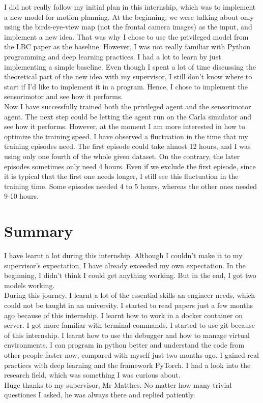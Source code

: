\documentclass[inputenc=utf8]{ldvarticle}
\begin{document}
\noindent I did not really follow my initial plan in this internship, which was to implement a new model for motion planning. At the beginning, we were talking about only using the birds-eye-view map (not the frontal camera images) as the input, and implement a new idea. That was why I chose to use the privileged model from the LBC paper as the baseline. However, I was not really familiar with Python programming and deep learning practices. I had a lot to learn by just implementing a simple baseline. Even though I spent a lot of time discussing the theoretical part of the new idea with my supervisor, I still don’t know where to start if I’d like to implement it in a program. Hence, I chose to implement the sensorimotor and see how it performs.
\\

\noindent Now I have successfully trained both the privileged agent and the sensorimotor agent. The next step could be letting the agent run on the Carla simulator and see how it performs. However, at the moment I am more interested in how to optimize the training speed. I have observed a fluctuation in the time that my training episodes need. The first episode could take almost 12 hours, and I was using only one fourth of the whole given dataset. On the contrary, the later episodes sometimes only need 4 hours. Even if we exclude the first episode, since it is typical that the first one needs longer, I still see this fluctuation in the training time. Some episodes needed 4 to 5 hours, whereas the other ones needed 9-10 hours.

\section {Summary}
I have learnt a lot during this internship. Although I couldn’t make it to my supervisor’s expectation, I have already exceeded my own expectation. In the beginning, I didn’t think I could get anything working. But in the end, I got two models working.
\\

\noindent During this journey, I learnt a lot of the essential skills an engineer needs, which could not be taught in an university. I started to read papers just a few months ago because of this internship. I learnt how to work in a docker container on server. I got more familiar with terminal commands. I started to use git because of this internship. I learnt how to use the debugger and how to manage virtual environments. I can program in python better and understand the code from other people faster now, compared with myself just two months ago. I gained real practices with deep learning and the framework PyTorch. I had a look into the research field, which was something I was curious about.
\\

\noindent Huge thanks to my supervisor, Mr Matthes. No matter how many trivial questiones I asked, he was always there and replied patiently.



\nocite{*}
\end{document}
